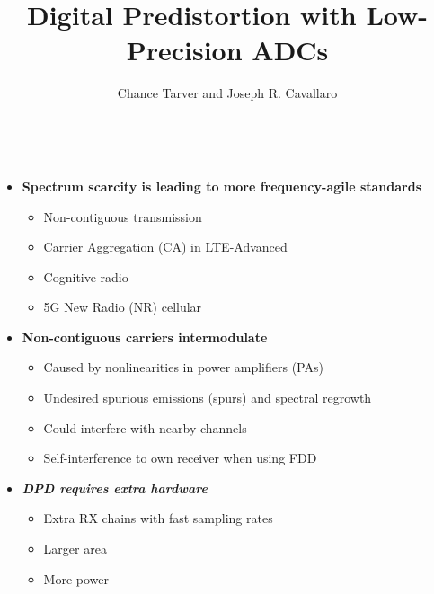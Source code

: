 \documentclass[25pt]{tikzposter} %
\title{\bf Digital Predistortion with Low-Precision ADCs}
\institute{Rice University} %
\author{Chance Tarver and Joseph R. Cavallaro}
\begin{document}
\maketitle %

\begin{columns} %
	\centering
	{    \Large
		\begin{itemize}
			\item {\bf Spectrum scarcity is leading to more frequency-agile standards}
			      \begin{itemize}
				      \item Non-contiguous transmission
				      \item Carrier Aggregation (CA) in LTE-Advanced
				      \item Cognitive radio
				      \item 5G New Radio (NR) cellular
			      \end{itemize}
			\item {\bf Non-contiguous carriers intermodulate}
			      \begin{itemize}
				      \item Caused by nonlinearities in power amplifiers (PAs)
				      \item Undesired spurious emissions (spurs) and spectral regrowth
				      \item Could interfere with nearby channels
				      \item Self-interference to own receiver when using FDD
			      \end{itemize}
			\item{\textbf{\textit{ DPD requires extra hardware}}}
				\begin{itemize}
					\item Extra RX chains with fast sampling rates 
					\item Larger area
					\item More power
				\end{itemize}			

\end{itemize}}
\end{columns}
\end{document}
